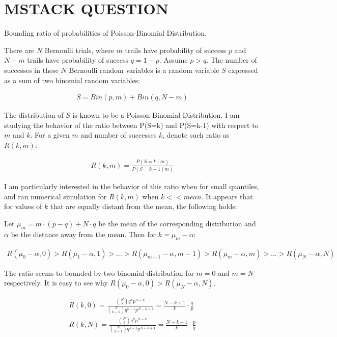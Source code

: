 \documentclass[11pt,draft]{article}
\begin{document}
\section{MSTACK QUESTION}
Bounding ratio of probabilities of Poisson-Binomial Distribution.

There are $N$ Bernoulli trials, where $m$  trails have probability of success $p$ and $N-m$ trails have probability of success $q=1-p$.  Assume $p>q$.
The number of successes in these $N$ Bernoulli random variables is a random variable $S$ expressed as a sum of two binomial random variables:

\begin{align}
S = Bin(p,m) + Bin(q,N-m)
\end{align}

The distribution of $S$ is known to be a Poisson-Binomial Distribution.
I am studying the behavior of the ratio between P(S=k) and P(S=k-1) with respect to $m$ and $k$.
For a given $m$ and number of successes $k$, denote such ratio as $R(k,m)$:

\begin{align}
R(k,m)  = \frac{P(S=k \; | \;m)}{P(S=k-1 \; |\;m)}
\end{align}

I am particularly interested in the behavior of this ratio when for small quantiles, and ran numerical simulation for $R(k,m)$ when $k << mean$. 
It appears that for values of $k$ that are equally distant from the mean, the following holds:

Let $\mu_m=m \cdot (p-q) + N \cdot q$ be the mean of the corresponding distribution and $\alpha$ be the distance away from the mean.
Then for $k=\mu_m - \alpha$:

\begin{align}
R(\mu_0 - \alpha,0)  > R(\mu_1 - \alpha,1) > \dots > R(\mu_{m-1} - \alpha,m-1) > R(\mu_{m} - \alpha,m) > \dots > R(\mu_{N} - \alpha,N) 
\end{align}

The ratio seems to bounded by two binomial distribution for $m=0$ and $m=N$ respectively.
It is easy to see why  $R(\mu_0 - \alpha,0) >  R(\mu_{N} - \alpha,N)$.

\begin{align}
R(k,0) = \frac{\binom{N}{k} q^kp^{N-k}}{\binom{N}{k-1} q^{k-1}p^{N-k+1}} = \frac{N-k+1}{k} \cdot \frac{q}{p} \\
R(k,N) = \frac{\binom{N}{k} q^kp^{N-k}}{\binom{N}{k-1} q^{k-1}p^{N-k+1}} = \frac{N-k+1}{k} \cdot \frac{p}{q} 
\end{align}
\end{document}
